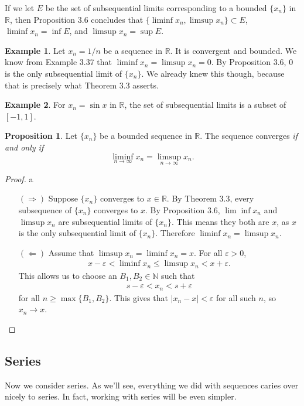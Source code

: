 \documentclass{article}
\newcommand{\N}{\mathbb{N}}
\newcommand{\R}{\mathbb{R}}
\theoremstyle{definition}
\newtheorem{proposition}{Proposition}[section]
\newtheorem{example}{Example}[section]
\begin{document}
	If we let $ E $ be the set of subsequential limits corresponding to a bounded $ \{x_n\} $ in $ \R $, then Proposition 3.6 concludes that $ \{\liminf x_n,\limsup x_n\}\subset E $, $ \liminf x_n=\inf E $, and $ \limsup x_n=\sup E $. 
	\begin{example}
		Let $ x_n=1/n $ be a sequence in $ \R $. It is convergent and bounded. We know from Example 3.37 that $ \liminf x_n=\limsup x_n=0 $. By Proposition 3.6, $ 0 $ is the only subsequential limit of $ \{x_n\} $. We already knew this though, because that is precisely what Theorem 3.3 asserts.
	\end{example}
	\begin{example}
		For $ x_n=\sin x $ in $ \R $, the set of subsequential limits is a subset of $ [-1,1] $. 
	\end{example}
	\begin{proposition}
		Let $ \{x_n\} $ be a bounded sequence in $ \R $. The sequence converges \textit{if and only if} $$ \liminf\limits_{n\to\infty} x_n=\limsup\limits_{n\to\infty} x_n.$$
	\end{proposition}
	\begin{proof}{\color{white}a}
		\begin{enumerate}
			\item [$ (\Longrightarrow) $] Suppose $ \{x_n\} $ converges to $ x\in \R $. By Theorem 3.3, every subsequence of $ \{x_n\} $ converges to $ x $. By Proposition 3.6, $ \lim\inf x_n $ and $ \limsup x_n $ are subsequential limits of $ \{x_n\} $. This means they both are $ x $, as $ x $ is the only subsequential limit of $ \{x_n\} $. Therefore $ \liminf x_n=\limsup x_n $.  
			\item [$ (\Longleftarrow) $] Assume that $ \limsup x_n=\liminf x_n=x $. For all $ \varepsilon>0 $, 
			\begin{align*}
				x-\varepsilon < \liminf x_n \le \limsup x_n< x+\varepsilon.
			\end{align*}
			This allows us to choose an $ B_1,B_2\in\N $ such that
			\begin{align*}
				s-\varepsilon<x_n<s+\varepsilon
			\end{align*}
			for all $ n\ge\max\{B_1,B_2\} $. This gives that $ |x_n-x|<\varepsilon $ for all such $ n $, so $ x_n\to x $. 
		\end{enumerate}
	\end{proof}
	\subsection{Series}
	Now we consider series. As we'll see, everything we did with sequences caries over nicely to series. In fact, working with series will be even simpler.
	
\end{document}
